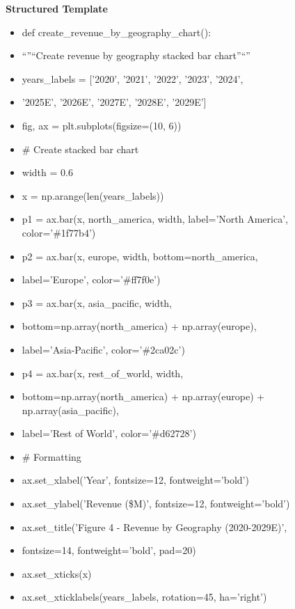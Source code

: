\documentclass[11pt]{article}
\begin{document}
\textbf{Structured Template}
\begin{itemize}[leftmargin=*,itemsep=2pt,topsep=2pt]
\item {} def create\_\allowbreak{}revenue\_\allowbreak{}by\_\allowbreak{}geography\_\allowbreak{}chart():
\item {} ``''``Create revenue by geography stacked bar chart''``''
\item {} years\_\allowbreak{}labels = ['2020', '2021', '2022', '2023', '2024',
\item {} '2025E', '2026E', '2027E', '2028E', '2029E']
\item {} fig, ax = plt.subplots(figsize=(10, 6))
\item {} \# Create stacked bar chart
\item {} width = 0.6
\item {} x = np.arange(len(years\_\allowbreak{}labels))
\item {} p1 = ax.bar(x, north\_\allowbreak{}america, width, label='North America', color='\#1f77b4')
\item {} p2 = ax.bar(x, europe, width, bottom=north\_\allowbreak{}america,
\item {} label='Europe', color='\#ff7f0e')
\item {} p3 = ax.bar(x, asia\_\allowbreak{}pacific, width,
\item {} bottom=np.array(north\_\allowbreak{}america) + np.array(europe),
\item {} label='Asia-Pacific', color='\#2ca02c')
\item {} p4 = ax.bar(x, rest\_\allowbreak{}of\_\allowbreak{}world, width,
\item {} bottom=np.array(north\_\allowbreak{}america) + np.array(europe) + np.array(asia\_\allowbreak{}pacific),
\item {} label='Rest of World', color='\#d62728')
\item {} \# Formatting
\item {} ax.set\_\allowbreak{}xlabel('Year', fontsize=12, fontweight='bold')
\item {} ax.set\_\allowbreak{}ylabel('Revenue (\$M)', fontsize=12, fontweight='bold')
\item {} ax.set\_\allowbreak{}title('Figure 4 - Revenue by Geography (2020-2029E)',
\item {} fontsize=14, fontweight='bold', pad=20)
\item {} ax.set\_\allowbreak{}xticks(x)
\item {} ax.set\_\allowbreak{}xticklabels(years\_\allowbreak{}labels, rotation=45, ha='right')

\end{itemize}
\end{document}
